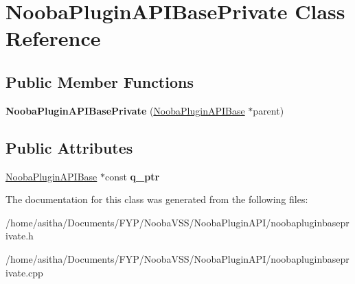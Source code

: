 \hypertarget{class_nooba_plugin_a_p_i_base_private}{\section{Nooba\-Plugin\-A\-P\-I\-Base\-Private Class Reference}
\label{class_nooba_plugin_a_p_i_base_private}
}
\subsection*{Public Member Functions}
\begin{DoxyCompactItemize}
\item 
\hypertarget{class_nooba_plugin_a_p_i_base_private_a1394e8b0fe3269b0996626445e35546c}{{\bfseries Nooba\-Plugin\-A\-P\-I\-Base\-Private} (\hyperlink{class_nooba_plugin_a_p_i_base}{Nooba\-Plugin\-A\-P\-I\-Base} $\ast$parent)}\label{class_nooba_plugin_a_p_i_base_private_a1394e8b0fe3269b0996626445e35546c}

\end{DoxyCompactItemize}
\subsection*{Public Attributes}
\begin{DoxyCompactItemize}
\item 
\hypertarget{class_nooba_plugin_a_p_i_base_private_a0952c0e27666aa2d8d62ca0ea246f07c}{\hyperlink{class_nooba_plugin_a_p_i_base}{Nooba\-Plugin\-A\-P\-I\-Base} $\ast$const {\bfseries q\-\_\-ptr}}\label{class_nooba_plugin_a_p_i_base_private_a0952c0e27666aa2d8d62ca0ea246f07c}

\end{DoxyCompactItemize}


The documentation for this class was generated from the following files\-:\begin{DoxyCompactItemize}
\item 
/home/asitha/\-Documents/\-F\-Y\-P/\-Nooba\-V\-S\-S/\-Nooba\-Plugin\-A\-P\-I/noobapluginbaseprivate.\-h\item 
/home/asitha/\-Documents/\-F\-Y\-P/\-Nooba\-V\-S\-S/\-Nooba\-Plugin\-A\-P\-I/noobapluginbaseprivate.\-cpp\end{DoxyCompactItemize}
